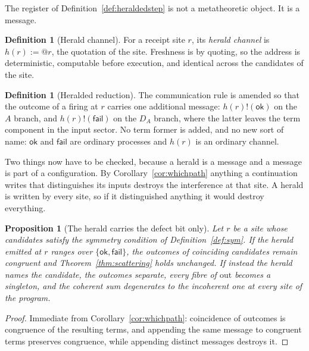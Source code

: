 \documentclass[11pt,a4paper]{article}
\theoremstyle{plain}
\newtheorem{proposition}[theorem]{Proposition}
\theoremstyle{definition}
\newtheorem{definition}[theorem]{Definition}
\theoremstyle{remark}
\newcommand{\Out}{\mathrm{out}}
\begin{document}
The register of Definition~\ref{def:heraldedstep} is not a metatheoretic object.
It is a message.

\begin{definition}[Herald channel]\label{def:heraldchan}
For a receipt site $r$, its \emph{herald channel} is $h(r) := @r$, the quotation
of the site. Freshness is by quoting, so the address is deterministic, computable
before execution, and identical across the candidates of the site.
\end{definition}

\begin{definition}[Heralded reduction]\label{def:heraldedred}
The communication rule is amended so that the outcome of a firing at $r$ carries
one additional message: $h(r)!(\mathsf{ok})$ on the $A$ branch, and
$h(r)!(\mathsf{fail})$ on the $D_A$ branch, where the latter leaves the term
component in the input sector. No term former is added, and no new sort of name:
$\mathsf{ok}$ and $\mathsf{fail}$ are ordinary processes and $h(r)$ is an
ordinary channel.
\end{definition}

Two things now have to be checked, because a herald is a message and a message
is part of a configuration. By Corollary~\ref{cor:whichpath} anything a
continuation writes that distinguishes its inputs destroys the interference at
that site. A herald is written by every site, so if it distinguished anything it
would destroy everything.

\begin{proposition}[The herald carries the defect bit only]\label{prop:defectbit}
Let $r$ be a site whose candidates satisfy the symmetry condition of
Definition~\ref{def:sym}. If the herald emitted at $r$ ranges over
$\{\mathsf{ok},\mathsf{fail}\}$, the outcomes of coinciding candidates remain
congruent and Theorem~\ref{thm:scattering} holds unchanged. If instead the
herald names the candidate, the outcomes separate, every fibre of $\Out$ becomes
a singleton, and the coherent sum degenerates to the incoherent one at every
site of the program.
\end{proposition}

\begin{proof}
Immediate from Corollary~\ref{cor:whichpath}: coincidence of outcomes is
congruence of the resulting terms, and appending the same message to congruent
terms preserves congruence, while appending distinct messages destroys it.
\end{proof}
\end{document}
